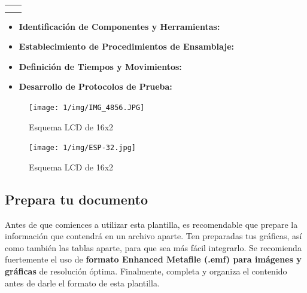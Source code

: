       \begin{tabular}{c|c}
           &  \\
           & 
      \end{tabular}
    
        
    \begin{itemize}
        
    \item \textbf{Identificación de Componentes y Herramientas:}
    
    \item \textbf{Establecimiento de Procedimientos de Ensamblaje:}
    
    \item \textbf{Definición de Tiempos y Movimientos:}
    
    \item \textbf{Desarrollo de Protocolos de Prueba:}
        
    \end{itemize}
    \begin{figure}[H]
        \centering
        \texttt{[image: 1/img/IMG\_4856.JPG]}
        \caption{Esquema LCD de 16x2}
        \label{fig:IMG_4856.JPG}
    \end{figure}
    \begin{figure}[H] 
        \centering
        \texttt{[image: 1/img/ESP-32.jpg]}
        \caption{Esquema LCD de 16x2}
    
    
        \label{fig:img/ESP-32.jpg}
    \end{figure}
    \subsection{Prepara tu documento}
    
    Antes de que comiences a utilizar esta plantilla, es recomendable que prepare la información que contendrá en un archivo aparte. 
    Ten preparadas tus gráficas, así como también las tablas aparte, para que sea más fácil integrarlo. 
    Se recomienda fuertemente el uso de \textbf{formato Enhanced Metafile (.emf) para imágenes y gráficas} de resolución óptima. 
    Finalmente, completa y organiza el contenido antes de darle el formato de esta plantilla. 
    
